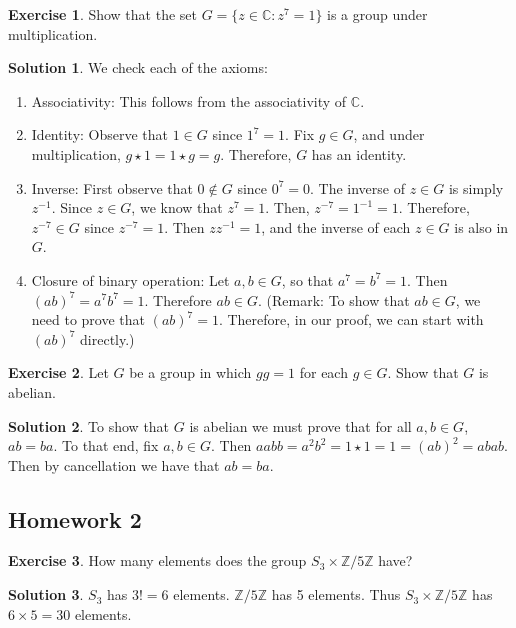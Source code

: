 \documentclass[12pt]{article}
\theoremstyle{definition}
\newcommand{\Z}{\mathbb{Z}}
\newtheorem{exercise}{\color{YellowOrange}Exercise}
\theoremstyle{definition}
\newtheorem{solution}{\color{Goldenrod}Solution}
\begin{document}
\begin{exercise}
Show that the set $G = \{z \in \mathbb{C}: z^7 = 1\}$ is a group under multiplication.
\end{exercise}
\begin{solution}
We check each of the axioms:
\begin{enumerate}
\item Associativity: This follows from the associativity of $\mathbb{C}$.
\item Identity: Observe that $1 \in G$ since $1^7 = 1$. Fix $g \in G$, and under multiplication, $g \star 1 = 1 \star g = g$. Therefore, $G$ has an identity.
\item Inverse: First observe that $0 \not\in G$ since $0^7 = 0$. The inverse of $z \in G$ is simply $z^{-1}$. Since $z \in G$, we know that $z^7 = 1$. Then, $z^{-7} = 1^{-1} = 1$. Therefore, $z^{-7} \in G$ since $z^{-7} = 1$. Then $z z^{-1} = 1$, and the inverse of each $z \in G$ is also in $G$.
\item Closure of binary operation: Let $a,b \in G$, so that $a^7 = b^7 = 1$. Then $(ab)^7 = a^7 b^7 = 1$. Therefore $ab \in G$. (Remark: To show that $ab \in G$, we need to prove that $(ab)^7 = 1$. Therefore, in our proof, we can start with $(ab)^7$ directly.)
\end{enumerate}
\end{solution}

\begin{exercise}
Let $G$ be a group in which $gg = 1$ for each $g \in G$. Show that $G$ is abelian.
\end{exercise}
\begin{solution}
To show that $G$ is abelian we must prove that for all $a,b \in G$, $ab = ba$. To that end, fix $a,b \in G$. Then $aabb = a^2 b^2 = 1 \star 1 = 1 = (ab)^2 = abab$. Then by cancellation we have that $ab = ba$.
\end{solution}


\subsection{Homework 2}
\begin{exercise}
How many elements does the group $S_3 \times \mathbb{Z}/5\mathbb{Z}$ have?
\end{exercise}
\begin{solution}
$S_3$ has $3! = 6$ elements. $\Z / 5 \Z$ has 5 elements. Thus $S_3 \times \mathbb{Z}/5\mathbb{Z}$ has $ 6 \times 5 = 30$ elements. 
\end{solution}
\end{document}

